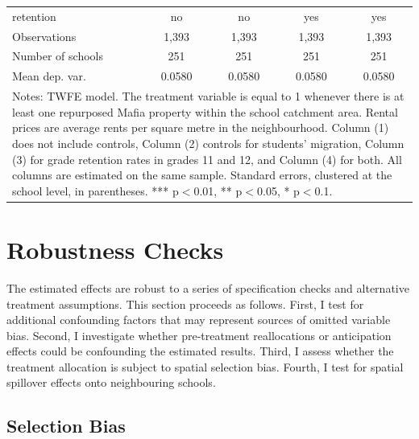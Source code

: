 \documentclass[12pt]{article}
\theoremstyle{plain}
\theoremstyle{plain}
\theoremstyle{plain}
\theoremstyle{definition}
\theoremstyle{plain}
\theoremstyle{definition}
\theoremstyle{plain}
\theoremstyle{remark}
\theoremstyle{definition}
\theoremstyle{definition}
\theoremstyle{plain}
\begin{document}
\begin{table}[H]
{\begin{tabular}{p{7.39em}llll}
			\multicolumn{1}{l}{retention} & \multicolumn{1}{c}{no} & \multicolumn{1}{c}{no} & \multicolumn{1}{c}{yes} & \multicolumn{1}{c}{yes} \\
			\multicolumn{1}{l}{Observations} & \multicolumn{1}{c}{1,393} & \multicolumn{1}{c}{1,393} & \multicolumn{1}{c}{1,393} & \multicolumn{1}{c}{1,393} \\
			\multicolumn{1}{l}{Number of schools} & \multicolumn{1}{c}{251} & \multicolumn{1}{c}{251} & \multicolumn{1}{c}{251} & \multicolumn{1}{c}{251} \\
			\multicolumn{1}{l}{Mean dep. var.} & \multicolumn{1}{c}{0.0580} & \multicolumn{1}{c}{0.0580} & \multicolumn{1}{c}{0.0580} & \multicolumn{1}{c}{0.0580} \\
			\midrule
			\multicolumn{5}{p{37.61em}}{Notes: TWFE model. The treatment variable is equal to 1 whenever there is at least one repurposed Mafia property within the school catchment area. Rental prices are average rents per square metre in the neighbourhood. Column (1) does not include controls, Column (2) controls for students' migration, Column (3) for grade retention rates in grades 11 and 12, and Column (4) for both. All columns are estimated on the same sample. Standard errors, clustered at the school level, in parentheses. *** p$<$0.01, ** p$<$0.05, * p$<$0.1.} \\
		\end{tabular}%
	}
\end{table}




\section{Robustness Checks}
\label{sec:jmp_robustness}
The estimated effects are robust to a series of specification checks and alternative treatment assumptions. This section proceeds as follows. First, I test for additional confounding factors that may represent sources of omitted variable bias. Second, I investigate whether pre-treatment reallocations or anticipation effects could be confounding the estimated results. Third, I assess whether the treatment allocation is subject to spatial selection bias. Fourth, I test for spatial spillover effects onto neighbouring schools. \par 
\medskip

\subsection{Selection Bias}
\label{sec:jmp_ovb}
\end{document}
